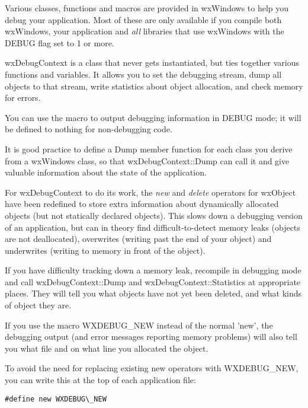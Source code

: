 
Various classes, functions and macros are provided in wxWindows to help you debug
your application. Most of these are only available if you compile both wxWindows,
your application and {\it all} libraries that use wxWindows with the DEBUG flag
set to 1 or more.

wxDebugContext is a class that never gets instantiated, but ties together
various functions and variables. It allows you to set the debugging stream, dump
all objects to that stream, write statistics about object allocation, and
check memory for errors.

You can use the  macro to output debugging information in DEBUG mode;
it will be defined to nothing for non-debugging code.

It is good practice to define a Dump member function for each class you derive
from a wxWindows class, so that wxDebugContext::Dump can call it and
give valuable information about the state of the application.

For wxDebugContext to do its work, the {\it new} and {\it delete}\rtfsp
operators for wxObject have been redefined to store extra information
about dynamically allocated objects (but not statically declared
objects). This slows down a debugging version of an application, but can
in theory find difficult-to-detect memory leaks (objects are not
deallocated), overwrites (writing past the end of your object) and
underwrites (writing to memory in front of the object).

If you have difficulty tracking down a memory leak, recompile
in debugging mode and call wxDebugContext::Dump and wxDebugContext::Statistics
at appropriate places. They will tell you what objects have not yet been
deleted, and what kinds of object they are.

If you use the macro WXDEBUG\_NEW instead of the normal 'new', the debugging
output (and error messages reporting memory problems) will also tell you what
file and on what line you allocated the object.

To avoid the need for replacing existing new operators with WXDEBUG\_NEW, you
can write this at the top of each application file:

\begin{verbatim}
#define new WXDEBUG\_NEW
\end{verbatim}

